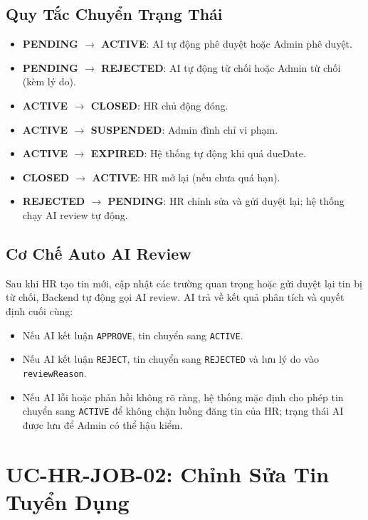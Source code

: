 \documentclass[12pt, a4paper]{report}
\begin{document}
\subsection{Quy Tắc Chuyển Trạng Thái}

\begin{itemize}
    \item \textbf{PENDING $\rightarrow$ ACTIVE}: AI tự động phê duyệt hoặc Admin phê duyệt.
    \item \textbf{PENDING $\rightarrow$ REJECTED}: AI tự động từ chối hoặc Admin từ chối (kèm lý do).
    \item \textbf{ACTIVE $\rightarrow$ CLOSED}: HR chủ động đóng.
    \item \textbf{ACTIVE $\rightarrow$ SUSPENDED}: Admin đình chỉ vi phạm.
    \item \textbf{ACTIVE $\rightarrow$ EXPIRED}: Hệ thống tự động khi quá dueDate.
    \item \textbf{CLOSED $\rightarrow$ ACTIVE}: HR mở lại (nếu chưa quá hạn).
    \item \textbf{REJECTED $\rightarrow$ PENDING}: HR chỉnh sửa và gửi duyệt lại; hệ thống chạy AI review tự động.
\end{itemize}

\subsection{Cơ Chế Auto AI Review}

Sau khi HR tạo tin mới, cập nhật các trường quan trọng hoặc gửi duyệt lại tin bị từ chối, Backend tự động gọi AI review. AI trả về kết quả phân tích và quyết định cuối cùng:
\begin{itemize}
    \item Nếu AI kết luận \texttt{APPROVE}, tin chuyển sang \texttt{ACTIVE}.
    \item Nếu AI kết luận \texttt{REJECT}, tin chuyển sang \texttt{REJECTED} và lưu lý do vào \texttt{reviewReason}.
    \item Nếu AI lỗi hoặc phản hồi không rõ ràng, hệ thống mặc định cho phép tin chuyển sang \texttt{ACTIVE} để không chặn luồng đăng tin của HR; trạng thái AI được lưu để Admin có thể hậu kiểm.
\end{itemize}

\section{UC-HR-JOB-02: Chỉnh Sửa Tin Tuyển Dụng}
\end{document}
